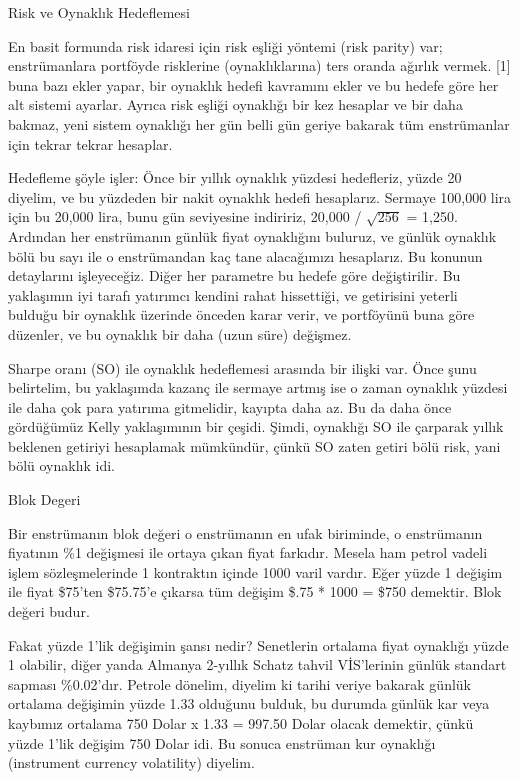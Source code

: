 \documentclass[12pt,fleqn]{article}\usepackage{../../common}
\begin{document}
Risk ve Oynaklık Hedeflemesi

En basit formunda risk idaresi için risk eşliği yöntemi (risk parity) var;
enstrümanlara portföyde risklerine (oynaklıklarına) ters oranda ağırlık
vermek. [1] buna bazı ekler yapar, bir oynaklık hedefi kavramını ekler ve bu
hedefe göre her alt sistemi ayarlar. Ayrıca risk eşliği oynaklığı bir kez
hesaplar ve bir daha bakmaz, yeni sistem oynaklığı her gün belli gün geriye
bakarak tüm enstrümanlar için tekrar tekrar hesaplar.

Hedefleme şöyle işler: Önce bir yıllık oynaklık yüzdesi hedefleriz, yüzde 20
diyelim, ve bu yüzdeden bir nakit oynaklık hedefi hesaplarız. Sermaye 100,000
lira için bu 20,000 lira, bunu gün seviyesine indiririz, 20,000 / $\sqrt{256}$ =
1,250. Ardından her enstrümanın günlük fiyat oynaklığını buluruz, ve günlük
oynaklık bölü bu sayı ile o enstrümandan kaç tane alacağımızı hesaplarız. Bu
konunun detaylarını işleyeceğiz. Diğer her parametre bu hedefe göre
değiştirilir. Bu yaklaşımın iyi tarafı yatırımcı kendini rahat hissettiği, ve
getirisini yeterli bulduğu bir oynaklık üzerinde önceden karar verir, ve
portföyünü buna göre düzenler, ve bu oynaklık bir daha (uzun süre) değişmez.

Sharpe oranı (SO) ile oynaklık hedeflemesi arasında bir ilişki var. Önce şunu
belirtelim, bu yaklaşımda kazanç ile sermaye artmış ise o zaman oynaklık yüzdesi
ile daha çok para yatırıma gitmelidir, kayıpta daha az. Bu da daha önce
gördüğümüz Kelly yaklaşımının bir çeşidi. Şimdi, oynaklığı SO ile çarparak
yıllık beklenen getiriyi hesaplamak mümkündür, çünkü SO zaten getiri bölü risk,
yani bölü oynaklık idi.

Blok Degeri

Bir enstrümanın blok değeri o enstrümanın en ufak biriminde, o enstrümanın
fiyatının \%1 değişmesi ile ortaya çıkan fiyat farkıdır. Mesela ham petrol
vadeli işlem sözleşmelerinde 1 kontraktın içinde 1000 varil vardır. Eğer yüzde 1
değişim ile fiyat \$75'ten \$75.75'e çıkarsa tüm değişim \$.75 * 1000 = \$750
demektir. Blok değeri budur. 

Fakat yüzde 1'lik değişimin şansı nedir? Senetlerin ortalama fiyat oynaklığı
yüzde 1 olabilir, diğer yanda Almanya 2-yıllık Schatz tahvil VİS'lerinin günlük
standart sapması \%0.02'dır. Petrole dönelim, diyelim ki tarihi veriye bakarak
günlük ortalama değişimin yüzde 1.33 olduğunu bulduk, bu durumda günlük kar veya
kaybımız ortalama 750 Dolar x 1.33 = 997.50 Dolar olacak demektir, çünkü yüzde
1'lik değişim 750 Dolar idi. Bu sonuca enstrüman kur oynaklığı (instrument
currency volatility) diyelim.
\end{document}
